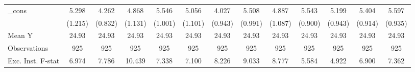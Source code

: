 {\begin{tabular}{l*{12}{c}}
\addlinespace
\_cons      &       5.298\sym{***}&       4.262\sym{***}&       4.868\sym{***}&       5.546\sym{***}&       5.056\sym{***}&       4.027\sym{***}&       5.508\sym{***}&       4.887\sym{***}&       5.543\sym{***}&       5.199\sym{***}&       5.404\sym{***}&       5.597\sym{***}\\
            &     (1.215)         &     (0.832)         &     (1.131)         &     (1.001)         &     (1.101)         &     (0.943)         &     (0.991)         &     (1.087)         &     (0.900)         &     (0.943)         &     (0.914)         &     (0.935)         \\
\midrule
Mean Y      &       24.93         &       24.93         &       24.93         &       24.93         &       24.93         &       24.93         &       24.93         &       24.93         &       24.93         &       24.93         &       24.93         &       24.93         \\
Observations&         925         &         925         &         925         &         925         &         925         &         925         &         925         &         925         &         925         &         925         &         925         &         925         \\
Exc. Inst. F-stat&       6.974         &       7.786         &      10.439         &       7.338         &       7.100         &       8.226         &       9.033         &       8.777         &       5.584         &       4.922         &       6.900         &       7.362         \\
\bottomrule
\end{tabular}
}

